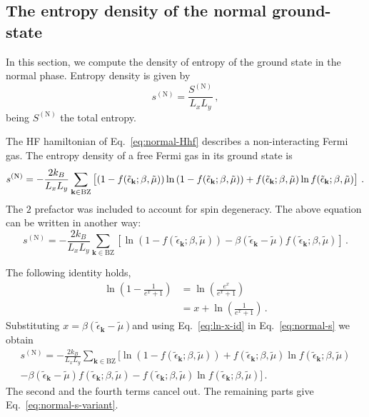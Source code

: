 \subsection{The entropy density of the normal ground-state}\label{subsec:normal-s}

In this section, we compute the density of entropy of the ground state in the normal phase. Entropy density is given by
\[
	s^{(\mathrm{N})} = \frac{S^{(\mathrm{N})}}{L_x L_y} \, ,
\]
being $S^{(\mathrm{N})}$ the total entropy.

The HF hamiltonian of Eq.~\eqref{eq:normal-Hhf} describes a non-interacting Fermi gas. The entropy density of a free Fermi gas in its ground state \cite{grosso2014solid} is
\begin{equation}\label{eq:normal-s}
	s^{(\mathrm{N})} = -\frac{2k_B}{L_x L_y} \sum_{\mathbf{k}\in\mathrm{BZ}} \left[
		\left(
			1- f(\tilde{\epsilon}_\mathbf{k}; \beta,\tilde{\mu})
		\right) \ln \left(
			1-f( \tilde{\epsilon}_\mathbf{k}; \beta,\tilde{\mu})
		\right) + f(
			\tilde{\epsilon}_\mathbf{k}; \beta,\tilde{\mu})
			\ln f( \tilde{\epsilon}_\mathbf{k}; \beta,\tilde{\mu})
		\vphantom{A^A}
	\right] \, .
\end{equation}
The $2$ prefactor was included to account for spin degeneracy. The above equation can be written in another way:
\begin{equation}\label{eq:normal-s-variant}
		s^{(\mathrm{N})} = -\frac{2k_B}{L_x L_y} \sum_{\mathbf{k}\in\mathrm{BZ}} \left[ \ln \left(
		1-f( \tilde{\epsilon}_\mathbf{k}; \beta,\tilde{\mu}) \right)
		- \beta  (\tilde{\epsilon}_\mathbf{k}-\tilde{\mu}) f( \tilde{\epsilon}_\mathbf{k}; \beta,\tilde{\mu}) 
	\right] \, .
\end{equation}

\begin{tabproof}

	The following identity holds,
	\begin{align}
		\ln \left(
		1-\frac{1}{e^x+1}
		\right) &= \ln \left(
		\frac{e^x}{e^x+1}
		\right) \nonumber \\
		&= x+\ln \left(
		\frac{1}{e^x+1}
		\right) \, . \label{eq:ln-x-id}
	\end{align}
	Substituting $x=\beta (\tilde{\epsilon}_\mathbf{k}-\tilde{\mu})$and using Eq.~\eqref{eq:ln-x-id} in Eq.~\eqref{eq:normal-s} we obtain
	\begin{multline*}
		s^{(\mathrm{N})} = -\frac{2k_B}{L_x L_y} \sum_{\mathbf{k}\in\mathrm{BZ}} \Big[ \ln \left(
		1- f( \tilde{\epsilon}_\mathbf{k}; \beta,\tilde{\mu}) \right) + f( \tilde{\epsilon}_\mathbf{k}; \beta,\tilde{\mu}) \ln f( \tilde{\epsilon}_\mathbf{k}; \beta,\tilde{\mu}) \\
		- \beta (\tilde{\epsilon}_\mathbf{k}-\tilde{\mu}) f( \tilde{\epsilon}_\mathbf{k}; \beta,\tilde{\mu}) - f( \tilde{\epsilon}_\mathbf{k}; \beta,\tilde{\mu}) \ln f( \tilde{\epsilon}_\mathbf{k}; \beta,\tilde{\mu})
		\Big] \, .
	\end{multline*}
	The second and the fourth terms cancel out. The remaining parts give Eq.~\eqref{eq:normal-s-variant}.
\end{tabproof}


